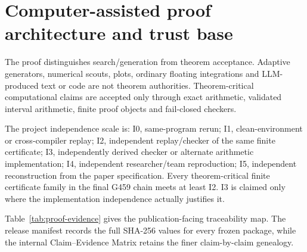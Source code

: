 \documentclass[11pt]{article}
\begin{document}
\section{Computer-assisted proof architecture and trust base}
The proof distinguishes search/generation from theorem acceptance. Adaptive generators, numerical scouts, plots, ordinary floating integrations and LLM-produced text or code are not theorem authorities. Theorem-critical computational claims are accepted only through exact arithmetic, validated interval arithmetic, finite proof objects and fail-closed checkers.

The project independence scale is: I0, same-program rerun; I1, clean-environment or cross-compiler replay; I2, independent replay/checker of the same finite certificate; I3, independently derived checker or alternate arithmetic implementation; I4, independent researcher/team reproduction; I5, independent reconstruction from the paper specification. Every theorem-critical finite certificate family in the final G459 chain meets at least I2. I3 is claimed only where the implementation independence actually justifies it.

Table~\ref{tab:proof-evidence} gives the publication-facing traceability map. The release manifest records the full SHA-256 values for every frozen package, while the internal Claim--Evidence Matrix retains the finer claim-by-claim genealogy.
\end{document}
